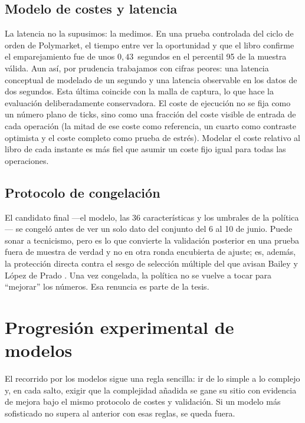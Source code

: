 \documentclass[11pt,a4paper]{article}
\begin{document}
\subsection{Modelo de costes y latencia}

La latencia no la supusimos: la medimos. En una prueba controlada del ciclo de
orden de Polymarket, el tiempo entre ver la oportunidad y que el libro confirme el
emparejamiento fue de unos $0{,}43$~segundos en el percentil 95 de la muestra
válida. Aun así, por prudencia trabajamos con cifras peores: una latencia
conceptual de modelado de un segundo y una latencia observable en los datos de dos
segundos. Esta última coincide con la malla de captura, lo que hace la evaluación
deliberadamente conservadora. El coste de ejecución no se fija como un número plano
de ticks, sino como una fracción del coste visible de entrada de cada operación
(la mitad de ese coste como referencia, un cuarto como contraste optimista y el
coste completo como prueba de estrés). Modelar el coste relativo al libro de cada
instante es más fiel que asumir un coste fijo igual para todas las operaciones.

\subsection{Protocolo de congelación}

El candidato final ---el modelo, las 36 características y los umbrales de la
política--- se congeló antes de ver un solo dato del conjunto del 6 al 10 de junio.
Puede sonar a tecnicismo, pero es lo que convierte la validación posterior en una
prueba fuera de muestra de verdad y no en otra ronda encubierta de ajuste; es,
además, la protección directa contra el sesgo de selección múltiple del que avisan
Bailey y López de Prado \cite{bailey2014deflated}. Una vez congelada, la política no
se vuelve a tocar para ``mejorar'' los números. Esa renuncia es parte de la tesis.

\section{Progresión experimental de modelos}
\label{sec:experimentos}

El recorrido por los modelos sigue una regla sencilla: ir de lo simple a lo
complejo y, en cada salto, exigir que la complejidad añadida se gane su sitio con
evidencia de mejora bajo el mismo protocolo de costes y validación. Si un modelo
más sofisticado no supera al anterior con esas reglas, se queda fuera.
\end{document}
